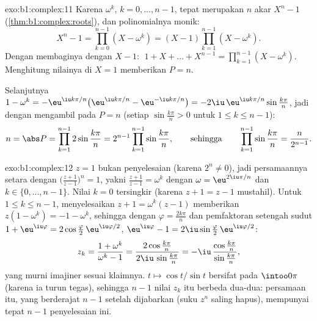 \begin{solution}{exo:b1:complex:11}
Karena $\omega^k$, $k = 0, \dots, n-1$, tepat merupakan $n$ akar
$X^n - 1$ (\cref{thm:b1:complex:roots}), dan polinomialnya
monik:
\[
X^n - 1 = \prod_{k=0}^{n-1} (X - \omega^k)
= (X - 1) \prod_{k=1}^{n-1} (X - \omega^k).
\]
Dengan membaginya dengan $X - 1$: $\;1 + X + \dots + X^{n-1} = \prod_{k=1}^{n-1}
(X - \omega^k)$. Menghitung nilainya di $X = 1$ memberikan $P = n$.

Selanjutnya $1 - \omega^k = -\eu^{\iu k\pi/n}\bigl(\eu^{\iu k\pi/n} -
\eu^{-\iu k\pi/n}\bigr) = -2\iu\,\eu^{\iu k\pi/n} \sin\frac{k\pi}{n}$,
jadi dengan mengambil  pada $P = n$ (setiap $\sin\frac{k\pi}n > 0$ untuk $1 \leq k
\leq n-1$):
\[
n = \abs P = \prod_{k=1}^{n-1} 2\sin\frac{k\pi}{n}
= 2^{n-1} \prod_{k=1}^{n-1} \sin\frac{k\pi}{n},
\qquad\text{sehingga}\qquad
\prod_{k=1}^{n-1} \sin\frac{k\pi}{n} = \frac{n}{2^{n-1}} .
\]
\end{solution}

\begin{solution}{exo:b1:complex:12}
$z = 1$ bukan penyelesaian (karena $2^n \neq 0$), jadi persamaannya
setara dengan $\bigl(\frac{z+1}{z-1}\bigr)^n = 1$, yakni
$\frac{z+1}{z-1} = \omega^k$ dengan $\omega = \eu^{2\iu\pi/n}$ dan
$k \in \{0, \dots, n-1\}$. Nilai $k = 0$ tersingkir (karena $z + 1 =
z - 1$ mustahil). Untuk $1 \leq k \leq n - 1$, menyelesaikan
$z + 1 = \omega^k(z - 1)$ memberikan $z(1 - \omega^k) = -1 - \omega^k$,
sehingga dengan $\varphi = \frac{2k\pi}{n}$ dan pemfaktoran setengah sudut
$1 + \eu^{\iu\varphi} = 2\cos\frac\varphi2\,
\eu^{\iu\varphi/2}$, $\eu^{\iu\varphi} - 1 = 2\iu\sin\frac\varphi2
\,\eu^{\iu\varphi/2}$:
\[
z_k = \frac{1 + \omega^k}{\omega^k - 1}
= \frac{2\cos\frac{k\pi}{n}}{2\iu\,\sin\frac{k\pi}{n}}
= -\iu\,\frac{\cos\frac{k\pi}{n}}{\sin\frac{k\pi}{n}} ,
\]
yang murni imajiner sesuai klaimnya.  $t \mapsto \cos t/\sin t$ bersifat
 pada $\intoo0\pi$ (karena ia turun tegas), sehingga
$n - 1$ nilai $z_k$ itu berbeda dua-dua: persamaan itu, yang berderajat
$n - 1$ setelah dijabarkan (suku $z^n$ saling hapus), mempunyai tepat
$n - 1$ penyelesaian ini.
\end{solution}

